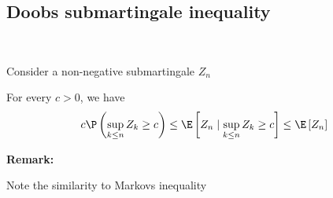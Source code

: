 \subsection{Doobs submartingale inequality}\hfill\\
\begin{theo}[]{}
  Consider a non-negative submartingale $Z_n$\par
  \noindent For every $c>0$, we have
  \begin{equation*}
    \begin{gathered}
      c\P\left(\sup_{k\leq n}Z_k\geq c\right)\leq \E\left[Z_n\mid\sup_{k\leq n}Z_k\geq c\right]\leq \E\left[Z_n\right]
    \end{gathered}
  \end{equation*}
  \par\bigskip
  \noindent\textbf{Remark:}\par
  \noindent Note the similarity to Markovs inequality
\end{theo}
\par\bigskip
